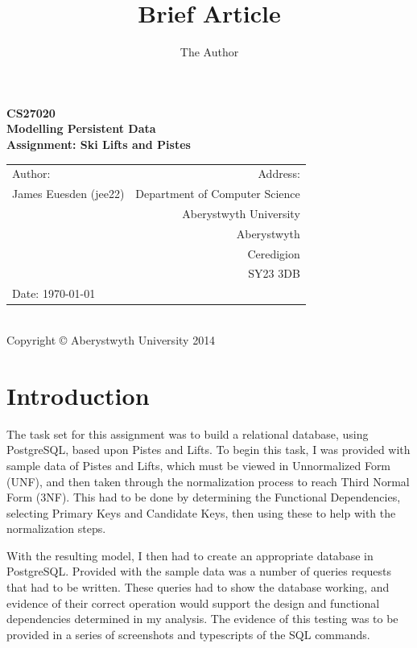 \documentclass[11pt]{scrartcl} %
\title{Brief Article}
\author{The Author}
\begin{document}
\newpage

\begin{center}
\textbf{\LARGE CS27020}\\[0.3cm]
\textbf{\LARGE Modelling Persistent Data}\\[0.5cm]
\textbf{\LARGE Assignment: Ski Lifts and Pistes }\\[13cm]

\begin{tabular}{ l | r }
{\large Author:} & {\large Address:} \\
James Euesden (jee22) &  Department of Computer Science \\
 & Aberystwyth University \\ 
 & Aberystwyth \\
 & Ceredigion \\
 & SY23 3DB \\
{\large Date:} \today  &  \\

\end{tabular} \\[0.2cm]

{\small Copyright © Aberystwyth University 2014}

\end{center}



\newpage

\section{Introduction}
The task set for this assignment was to build a relational database, using PostgreSQL, based upon Pistes and Lifts. To begin this task, I was provided with sample data of Pistes and Lifts, which must be viewed in Unnormalized Form (UNF), and then taken through the normalization process to reach Third Normal Form (3NF). This had to be done by determining the Functional Dependencies, selecting Primary Keys and Candidate Keys, then using these to help with the normalization steps.

With the resulting model, I then had to create an appropriate database in PostgreSQL. Provided with the sample data was a number of queries requests that had to be written. These queries had to show the database working, and evidence of their correct operation would support the design and functional dependencies determined in my analysis. The evidence of this testing was to be provided in a series of screenshots and typescripts of the SQL commands.
\end{document}
